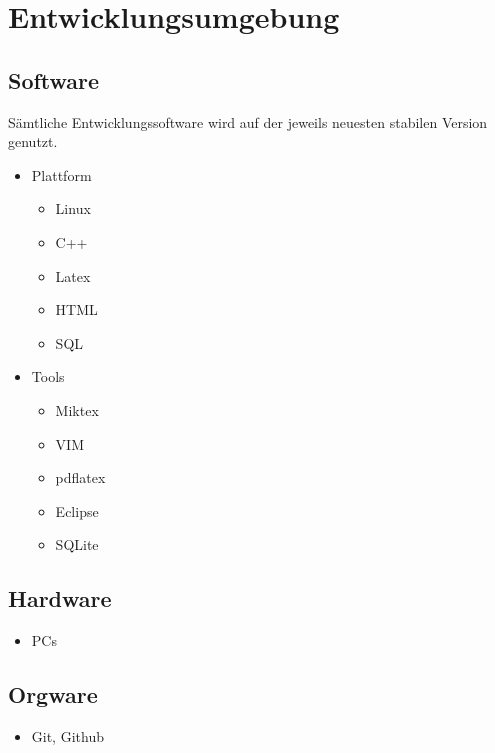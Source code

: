 
\section{Entwicklungsumgebung}


\subsection{Software}

Sämtliche Entwicklungssoftware wird auf der jeweils neuesten stabilen Version genutzt.

\begin{itemize}
	\item Plattform
		\begin{itemize}
		\item Linux
			\item C++
			\item Latex
			\item HTML
			\item SQL
		\end{itemize}
	\item Tools
		\begin{itemize}
			\item Miktex
			\item VIM
			\item pdflatex
			\item Eclipse
			\item SQLite
		\end{itemize}

\end{itemize}

\subsection{Hardware}

\begin{itemize}
	\item PCs
\end{itemize}

\subsection{Orgware}

\begin{itemize}
	\item Git, Github
\end{itemize}
